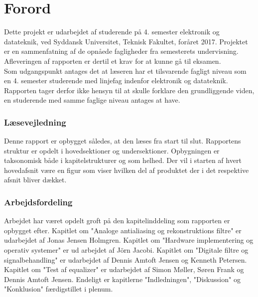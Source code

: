 \chapter*{Forord}\label{chap:forord}

Dette projekt er udarbejdet af studerende på 4. semester elektronik og datateknik, ved Syddansk Universitet, Teknisk Fakultet, foråret 2017. Projektet er en sammenfatning af de opnåede fagligheder fra semesterets undervisning. Afleveringen af rapporten er dertil et krav for at kunne gå til eksamen.\\

Som udgangspunkt antages det at læseren har et tilsvarende fagligt niveau som en 4. semester studerende med linjefag indenfor elektronik og datateknik.
Rapporten tager derfor ikke hensyn til at skulle forklare den grundliggende viden, en studerende med samme faglige niveau antages at have.

\subsection{Læsevejledning}
Denne rapport er opbygget således, at den læses fra start til slut. Rapportens struktur er opdelt i hovedsektioner og undersektioner. Opbygningen er taksonomisk både i kapitelstrukturer og som helhed. Der vil i starten af hvert hovedafsnit være en figur som viser hvilken del af produktet der i det respektive afsnit bliver dækket.

\subsection{Arbejdsfordeling}
Arbejdet har været opdelt groft på den kapitelinddeling som rapporten er opbygget efter. Kapitlet om "Analoge antialiasing og rekonstruktions filtre" er udarbejdet af Jonas Jensen Holmgren. Kapitlet om "Hardware implementering og operativ systemer" er ud arbejdet af Jörn Jacobi. Kapitlet om "Digitale filtre og signalbehandling" er udarbejdet af Dennis Amtoft Jensen og Kenneth Petersen. Kapitlet om "Test af equalizer" er udarbejdet af Simon Møller, Søren Frank og Dennis Amtoft Jensen. Endeligt er kapitlerne "Indledningen", "Diskussion" og "Konklusion" færdigstillet i plenum.


